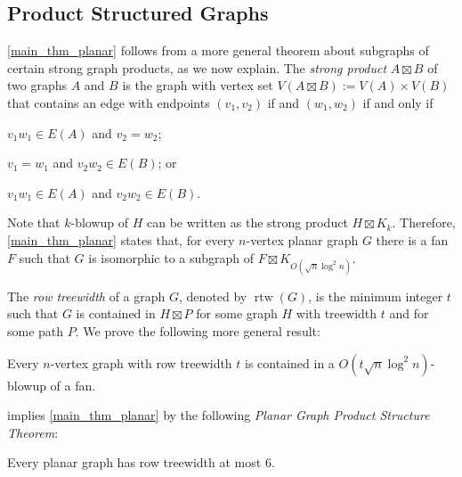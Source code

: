 \documentclass{patmorin}
\newcommand{\defin}[1]{\emph{\textcolor{brightmaroon}{#1}}}
\DeclareMathOperator{\rtw}{rtw}
\begin{document}
\subsection{Product Structured Graphs}

\cref{main_thm_planar} follows from a more general theorem about subgraphs of certain strong graph products, as we now explain.  The \defin{strong product} $A\boxtimes B$ of two graphs $A$ and $B$ is the graph with vertex set $V(A\boxtimes B):=V(A)\times V(B)$ that contains an edge with endpoints $(v_1,v_2)$ if and $(w_1,w_2)$ if and only if
\begin{compactenum}
    \item $v_1w_1\in E(A)$ and $v_2=w_2$;
    \item $v_1=w_1$ and $v_2w_2\in E(B)$; or
    \item $v_1w_1\in E(A)$ and $v_2w_2\in E(B)$.
\end{compactenum}
Note that $k$-blowup of $H$ can be written as the strong product $H\boxtimes K_k$.  Therefore, \cref{main_thm_planar} states that, for every $n$-vertex planar graph $G$ there is a fan $F$ such that $G$ is isomorphic to a subgraph of $F\boxtimes K_{O(\sqrt{n}\log^2 n)}$.

The \defin{row treewidth} of a graph $G$, denoted by $\rtw(G)$, is the minimum integer $t$ such that $G$ is contained in $H\boxtimes P$ for some graph $H$ with treewidth $t$ and for some path $P$. We prove the following more general result:


\begin{thm}\label{main_thm_products}
  Every $n$-vertex graph with row treewidth $t$ is contained in a $O(t\sqrt{n}\log^2 n)$-blowup of a fan.
\end{thm}

 implies \cref{main_thm_planar} by the following \defin{Planar Graph Product Structure Theorem}:

\begin{thm}\label{planar_product_structure}
  Every planar graph has row treewidth at most $6$.
\end{thm}
\end{document}
